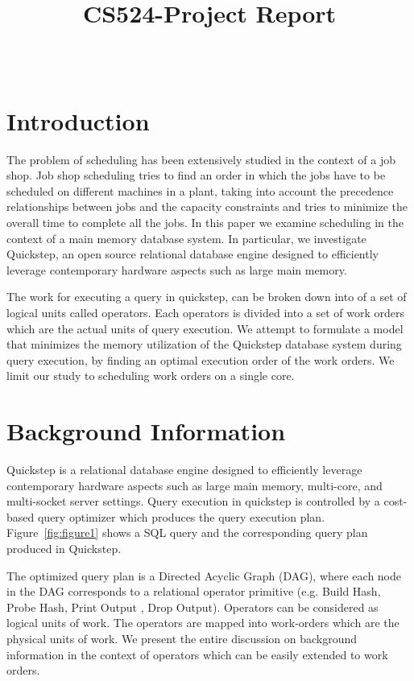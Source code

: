 \documentclass[20pt]{sigchi}
\def\plaintitle{CS524-Project Report}
\begin{document}
\title{\plaintitle}
\author{%
  \\ 
}

\maketitle
\normal
\section{Introduction}
The problem of scheduling has been extensively studied in the context of a job shop.  Job shop scheduling tries to find an order in which the jobs have to be scheduled on different machines in a plant, taking into account the precedence relationships between jobs and the capacity constraints and tries to minimize the overall time to complete all the jobs. In this paper we examine scheduling in the context of a main memory database system. In particular, we investigate Quickstep, an open source relational database engine designed to efficiently leverage contemporary hardware aspects such as large main memory. 

The work for executing a query in quickstep, can be broken down into of a set of logical units called operators. Each operators is divided into a set of work orders which are the actual units of query execution. We attempt to formulate a model that minimizes the  memory utilization of the Quickstep database system during query execution, by finding an optimal execution order of the work orders. We limit our study to scheduling work orders on a single core.
\vspace{-0.6em}
\section{Background Information} \label{sec:background}
Quickstep is a relational database engine designed to efficiently leverage contemporary hardware aspects such as large main memory, multi-core, and multi-socket server settings.
Query execution in quickstep is controlled by a cost-based query optimizer which produces the query execution plan. Figure~\ref{fig:figure1} shows a SQL query and the corresponding  query plan produced in Quickstep. 

The optimized query plan is  a Directed Acyclic Graph (DAG), where each node in the DAG corresponds to a relational operator primitive (e.g. Build Hash, Probe Hash, Print Output , Drop Output).  Operators can be considered as logical units of work. 
The operators are mapped into  work-orders which are the physical units of work. We present the entire discussion on background information in the context of  operators which can be easily extended to work orders.
\end{document}
